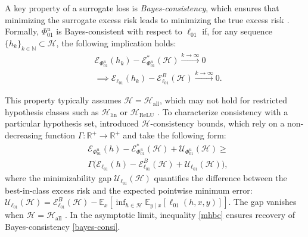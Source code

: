 A key property of a surrogate loss is \textit{Bayes-consistency}, which ensures that minimizing the surrogate excess risk leads to minimizing the true excess risk \citep{Statistical, bartlett1, Steinwart2007HowTC, tewari07a}. Formally, \(\Phi_{01}^u\) is Bayes-consistent with respect to \(\ell_{01}\) if, for any sequence \(\{h_k\}_{k \in \mathbb{N}} \subset \mathcal{H}\), the following implication holds:
\begin{equation}
\begin{aligned}\label{bayes-consi}
    & \mathcal{E}_{\Phi_{01}^u}(h_k) - \mathcal{E}_{\Phi_{01}^u}^\ast(\mathcal{H}) \xrightarrow{k \to \infty} 0 \\
    & \implies \mathcal{E}_{\ell_{01}}(h_k) - \mathcal{E}_{\ell_{01}}^B(\mathcal{H}) \xrightarrow{k \to \infty} 0.
\end{aligned}
\end{equation}

This property typically assumes \(\mathcal{H} = \mathcal{H}_{\text{all}}\), which may not hold for restricted hypothesis classes such as \(\mathcal{H}_{\text{lin}}\) or \(\mathcal{H}_{\text{ReLU}}\) \citep{pmlr-v28-long13, Awasthi_Mao_Mohri_Zhong_2022_multi, mao2024h}. To characterize consistency with a particular hypothesis set, \citet{Awasthi_Mao_Mohri_Zhong_2022_multi} introduced \(\mathcal{H}\)-consistency bounds, which rely on a non-decreasing function \(\Gamma: \mathbb{R}^+ \to \mathbb{R}^+\) and take the following form:
\begin{equation}\label{mhbc}
\begin{aligned}
     & \mathcal{E}_{\Phi_{01}^u}(h) - \mathcal{E}_{\Phi_{01}^u}^\ast(\mathcal{H}) + \mathcal{U}_{\Phi_{01}^u}(\mathcal{H}) \geq \\
     & \Gamma\Big(\mathcal{E}_{\ell_{01}}(h) - \mathcal{E}_{\ell_{01}}^B(\mathcal{H}) + \mathcal{U}_{\ell_{01}}(\mathcal{H})\Big),
\end{aligned}
\end{equation}
where the minimizability gap \(\mathcal{U}_{\ell_{01}}(\mathcal{H})\) quantifies the difference between the best-in-class excess risk and the expected pointwise minimum error: $\mathcal{U}_{\ell_{01}}(\mathcal{H}) = \mathcal{E}_{\ell_{01}}^B(\mathcal{H}) - \mathbb{E}_{x} \left[ \inf_{h \in \mathcal{H}} \mathbb{E}_{y \mid x} \left[ \ell_{01}(h,x,y) \right] \right]$. 
The gap vanishes when \(\mathcal{H} = \mathcal{H}_{\text{all}}\) \citep{Steinwart2007HowTC, Awasthi_Mao_Mohri_Zhong_2022_multi}. In the asymptotic limit, inequality \eqref{mhbc} ensures recovery of Bayes-consistency \eqref{bayes-consi}.



